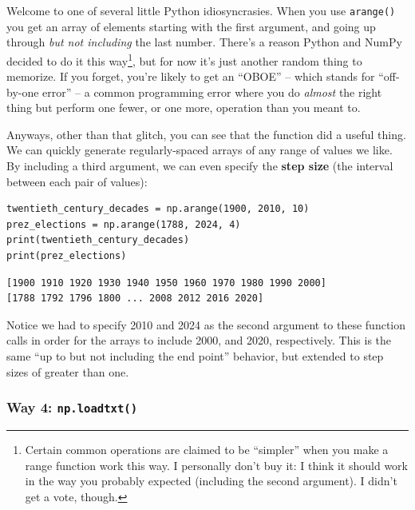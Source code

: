 
Welcome to one of several little Python idiosyncrasies. When you use
\texttt{arange()} you get an array of elements starting with the first
argument, and going up through \textit{but not including} the last number.
There's a reason Python and NumPy decided to do it this way\footnote{Certain
common operations are claimed to be ``simpler'' when you make a range function
work this way. I personally don't buy it: I think it should work in the way you
probably expected (including the second argument). I didn't get a vote,
though.}, but for now it's just another random thing to memorize. If you
forget, you're likely to get an ``OBOE'' -- which stands for ``off-by-one
error'' -- a common programming error where you do \textit{almost} the right
thing but perform one fewer, or one more, operation than you meant to.

Anyways, other than that glitch, you can see that the function did a useful
thing. We can quickly generate regularly-spaced arrays of any range of values
we like. By including a third argument, we can even specify the \textbf{step
size} (the interval between each pair of values):

\begin{Verbatim}[fontsize=\small,samepage=true,frame=single,framesep=3mm]
twentieth_century_decades = np.arange(1900, 2010, 10)
prez_elections = np.arange(1788, 2024, 4)
print(twentieth_century_decades)
print(prez_elections)
\end{Verbatim}

\begin{Verbatim}[fontsize=\small,samepage=true,frame=leftline,framesep=5mm,framerule=1mm]
[1900 1910 1920 1930 1940 1950 1960 1970 1980 1990 2000]
[1788 1792 1796 1800 ... 2008 2012 2016 2020]
\end{Verbatim}

Notice we had to specify 2010 and 2024 as the second argument to these function
calls in order for the arrays to include 2000, and 2020, respectively. This is
the same ``up to but not including the end point'' behavior, but extended to
step sizes of greater than one.

\subsubsection{Way 4: \texttt{np.loadtxt()}}
\label{np.loadtxt}


